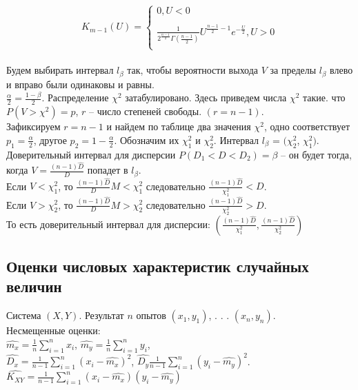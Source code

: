 \documentclass[russian, 12pt, fleqn]{article}
\begin{document}
\Large
\begin{equation*} 
K_{m - 1}(U)=
 \begin{cases}
   0 , U < 0\\
	\\
   \frac{1}{2 ^{\frac{n - 1}{2}}\Gamma(\frac{n - 1}{2})} U^{\frac{n - 1}{2} - 1}e^{-\frac{U}{2}}    , U > 0\\
 \end{cases}
\end{equation*}\\
\normalsize
Будем выбирать интервал $l_\beta$ так, чтобы вероятности выхода $V$ за пределы  $l_\beta$ влево и вправо были одинаковы  и равны.\\%
$\frac{\alpha}{2} = \frac{1 - \beta}{2}$. Распределение $\chi^2$ затабулировано. Здесь приведем числа $\chi^2$ такие. что $P(V> \chi^2) = p$, $r$ -- число степеней свободы.
$(r = n - 1)$.\\
Зафиксируем $r = n - 1$ и найдем по таблице два значения  $\chi^2$, одно соответствует $p_1 = \frac{\alpha}{2}$, другое $p_2 = 1 - \frac{\alpha}{2}$. Обозначим их $\chi_1^2$ и  $\chi_2^2$. Интервал $l_\beta$ = $ (\chi_2^2$, $\chi_1^2)$.\\
Доверительный интервал для дисперсии $P(D_1 < D < D_2) = \beta$ -- он будет тогда, когда $V = \frac{(n - 1) \hat{D}}{D}$ попадет в $l_\beta$.\\
Если $V < \chi_1^2$, то $\frac{(n - 1) \hat{D}}{D}M  < \chi_1^2$ следовательно $\frac{(n - 1) \hat{D}}{\chi_1^2} < D$.\\
Если $V > \chi_2^2$, то $\frac{(n - 1) \hat{D}}{D}M  > \chi_2^2$ следовательно $\frac{(n - 1) \hat{D}}{\chi_2^2} > D$.\\
То есть доверительный интервал для дисперсии: $(\frac{(n - 1) \hat{D}}{\chi_1^2}, \frac{(n - 1) \hat{D}}{\chi_2^2})$
\subsection{Оценки числовых характеристик случайных величин}
Система $(X, Y)$. Результат $n$ опытов $(x_1, y_1)$, . . . $(x_n, y_n)$.\\
Несмещенные оценки:\\
$\hat{m_x}= \frac{1}{n} \displaystyle{\sum\limits_{i = 1} ^{n}} x_i$,  $\hat{m_y}= \frac{1}{n} \displaystyle{\sum\limits_{i = 1} ^{n}} y_i$,\\
$\hat{D_x} = \frac{1}{n - 1} \displaystyle{\sum\limits_{i = 1} ^{n}} (x_i - \hat{m_x})^2$, 
$\hat{D_y} \frac{1}{n - 1} \displaystyle{\sum\limits_{i = 1} ^{n}} (y_i - \hat{m_y})^2$.\\
$\hat{K_{XY}} = \frac{1}{n - 1} \displaystyle{\sum\limits_{i = 1} ^{n}} (x_i - \hat{m_x}) (y_i - \hat{m_y})$ 
\end{document}
